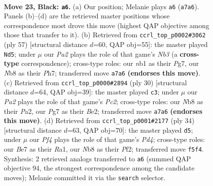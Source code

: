 \documentclass[11pt]{article}
\begin{document}
\clearpage

\begin{figure}[p]\centering
\begin{subfigure}{0.46\textwidth}\centering
\resizebox{\linewidth}{!}{%
\newchessgame
\chessboard[
  setfen={rn2kr2/pp2b1pp/4b3/3pPp1P/8/P5P1/4N3/RNB2RK1 b - - 4 23},
  showmover=false,
  pgfstyle=straightmove, color=movearrow, markmove={a7-a6}
]}
\caption{}
\end{subfigure}\hfill
\begin{subfigure}{0.46\textwidth}\centering
\resizebox{\linewidth}{!}{%
\newchessgame
\chessboard[
  setfen={2r5/4k1pp/1nr1pb2/2p5/7P/P3BN2/2R2PP1/4R1K1 b - - 2 29},
  showmover=false,
  pgfstyle=straightmove, color=movearrow, markmove={b6-d5}
]}
\caption{}
\end{subfigure}
\\[4pt]
\begin{subfigure}{0.46\textwidth}\centering
\resizebox{\linewidth}{!}{%
\newchessgame
\chessboard[
  setfen={r1b1kr2/pp2p1bp/2n3p1/8/8/8/PPP1BNPP/R1B2RK1 w - - 2 16},
  showmover=false,
  pgfstyle=straightmove, color=movearrow, markmove={c2-c3}
]}
\caption{}
\end{subfigure}\hfill
\begin{subfigure}{0.46\textwidth}\centering
\resizebox{\linewidth}{!}{%
\newchessgame
\chessboard[
  setfen={2nrkb1r/pp4pp/4pp2/8/3P1B2/1PN5/1P3PPP/R2R2K1 w k - 2 18},
  showmover=false,
  pgfstyle=straightmove, color=movearrow, markmove={d4-d5}
]}
\caption{}
\end{subfigure}
\caption{\textbf{Move 23, Black: \texttt{a6}.} (a) Our position; Melanie plays \texttt{a6} (\texttt{a7a6}). Panels (b)--(d) are the retrieved master positions whose correspondence most drove this move (highest QAP objective among those that transfer to it). (b) Retrieved from \texttt{ccrl\_top\_p0002\#3062} (ply 57) [structural distance $d$=60, QAP obj=55]: the master played \texttt{Nd5}; under $\mu$ our \emph{Pa2} plays the role of that game's \emph{Nb3} (a \textbf{cross-type} correspondence); cross-type roles: our \emph{n}b1 as their \emph{P}g7, our \emph{N}b8 as their \emph{P}h7; transferred move \texttt{a7a6} \textbf{(endorses this move)}. (c) Retrieved from \texttt{ccrl\_top\_p0000\#2894} (ply 30) [structural distance $d$=64, QAP obj=39]: the master played \texttt{c3}; under $\mu$ our \emph{Pa2} plays the role of that game's \emph{Pc2}; cross-type roles: our \emph{N}b8 as their \emph{P}a2, our \emph{P}g7 as their \emph{B}e2; transferred move \texttt{a7a6} \textbf{(endorses this move)}. (d) Retrieved from \texttt{ccrl\_top\_p0001\#2177} (ply 34) [structural distance $d$=63, QAP obj=70]: the master played \texttt{d5}; under $\mu$ our \emph{Pf4} plays the role of that game's \emph{Pd4}; cross-type roles: our \emph{B}e7 as their \emph{R}a1, our \emph{N}b8 as their \emph{P}f2; transferred move \texttt{f5f4}. Synthesis: 2 retrieved analogs transferred to \texttt{a6} (summed QAP objective 94, the strongest correspondence among the candidate moves); Melanie committed it via the \texttt{search} selector.}
\label{fig:thought-m45}
\end{figure}
\end{document}
